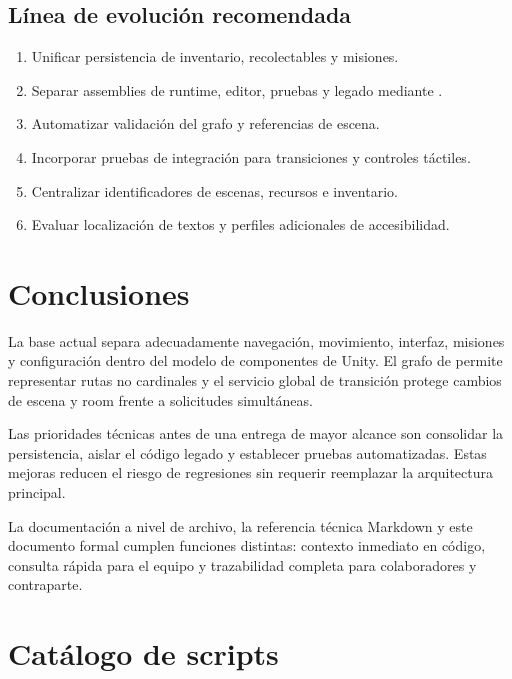 \documentclass[11pt,a4paper,oneside]{report}
\newcommand{\code}[1]{\texttt{\detokenize{#1}}}
\begin{document}
\section{Línea de evolución recomendada}

\begin{enumerate}
  \item Unificar persistencia de inventario, recolectables y misiones.
  \item Separar assemblies de runtime, editor, pruebas y legado mediante \code{asmdef}.
  \item Automatizar validación del grafo y referencias de escena.
  \item Incorporar pruebas de integración para transiciones y controles táctiles.
  \item Centralizar identificadores de escenas, recursos e inventario.
  \item Evaluar localización de textos y perfiles adicionales de accesibilidad.
\end{enumerate}

\chapter{Conclusiones}

La base actual separa adecuadamente navegación, movimiento, interfaz, misiones y configuración dentro del modelo de componentes de Unity. El grafo de \code{RoomNode} permite representar rutas no cardinales y el servicio global de transición protege cambios de escena y room frente a solicitudes simultáneas.

Las prioridades técnicas antes de una entrega de mayor alcance son consolidar la persistencia, aislar el código legado y establecer pruebas automatizadas. Estas mejoras reducen el riesgo de regresiones sin requerir reemplazar la arquitectura principal.

La documentación a nivel de archivo, la referencia técnica Markdown y este documento formal cumplen funciones distintas: contexto inmediato en código, consulta rápida para el equipo y trazabilidad completa para colaboradores y contraparte.

\appendix
\chapter{Catálogo de scripts}
\end{document}
